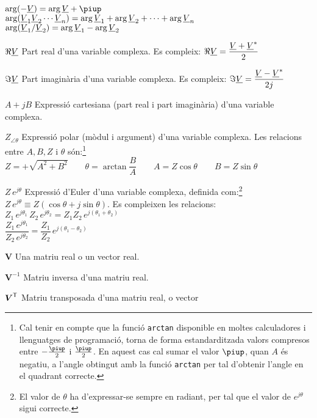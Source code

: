 \begin{list}{}
      $\arg(-\cmplx{V}) =  \arg\cmplx{V} + \piup$\\[1ex]
      $\arg(\underline{V}_1 \underline{V}_2 \cdots \underline{V}_n) = \arg\underline{V}_1 + \arg \underline{V}_2 + \cdots + \arg\underline{V}_n$\\[1ex]
      $\arg(\underline{V}_1 / \underline{V}_2) = \arg\underline{V}_1 - \arg \underline{V}_2$
    \item[$\Re\underline{V}$] Part real d'una variable complexa. Es compleix: $\Re\underline{V} = \dfrac{\underline{V} + \underline{V}^*}{2}$
    \item[$\Im\underline{V}$] Part imaginària d'una variable complexa. Es compleix: $\Im\underline{V} = \dfrac{\underline{V} - \underline{V}^*}{2 j}$
    \item[$A+j B$] Expressió cartesiana (part real i part
    imaginària) d'una variable complexa.
    \item[$Z_{\angle \theta}$] Expressió polar (mòdul i argument) d'una variable
    complexa. Les relacions entre $A, B, Z$ i $\theta$ són:\footnote{Cal tenir en compte que la funció \texttt{arctan} disponible en moltes calculadores i llenguatges de programació, torna de forma  estandarditzada valors compresos entre $-\frac{\piup}{2}$ i $\frac{\piup}{2}$. En aquest cas cal sumar el valor $\piup$, quan $A$ és negatiu, a l'angle obtingut amb la funció \texttt{arctan} per tal d'obtenir l'angle en el quadrant correcte.}\\[1ex]
    $Z=+\sqrt{A^2+B^2}\quad\quad\theta=\arctan{\dfrac{B}{A}}\quad\quad
    A=Z\cos\theta\quad\quad B=Z\sin\theta$
    \item[$Z\,e^{j\theta}$] Expressió d'Euler d'una variable complexa, definida com:\footnote{El valor de $\theta$ ha d'expressar-se sempre en radiant, per tal que el valor de $e^{j\theta}$ sigui correcte.}
     $Z\,e^{j\theta} \equiv Z(\cos\theta+j\sin\theta)$.
     Es compleixen les relacions:\\[1ex]
     $Z_1\,e^{j\theta_1} \, Z_2\,e^{j\theta_2} = Z_1 Z_2\,e^{j(\theta_1+\theta_2)}$\\[1ex]
     $\dfrac{Z_1\,e^{j\theta_1}}{Z_2\,e^{j\theta_2}} = \dfrac{Z_1}{Z_2}\,e^{j(\theta_1-\theta_2)}$
    \item[$\boldsymbol{V}$] Una matriu real o un vector real.
    \item[$\boldsymbol{V}^{-1}$] Matriu inversa d'una matriu real.
    \item[$\boldsymbol{V}^\mathrm{\textsf{T}}$] Matriu transposada d'una matriu real, o vector

\end{list}
